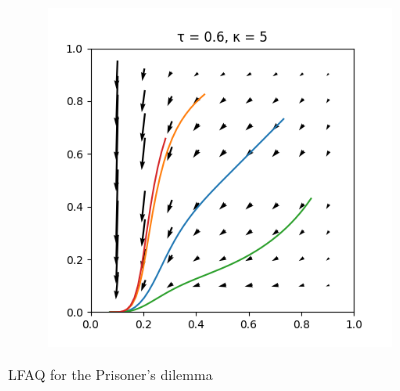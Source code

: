 \documentclass[10pt,a4paper]{article}
\begin{document}
\begin{figure}[h]
\begin{subfigure}[b]{0.30\textwidth}
    \end{subfigure}
    \begin{subfigure}[b]{0.30\textwidth}
        \includegraphics[width=\textwidth]{Figures/boltzmann_pd_5.png}
    \end{subfigure}
    \caption{LFAQ for the Prisoner's dilemma}
    \label{fig:boltz_pd}
\end{figure}
\end{document}
